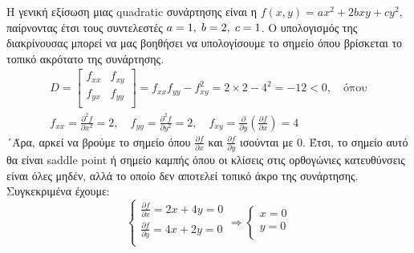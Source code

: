 Η γενική εξίσωση μιας quadratic συνάρτησης είναι η $f(x,y) = ax^2 + 2bxy + cy^2$, παίρνοντας έτσι τους συντελεστές $a=1, \hspace{1mm} b=2, \hspace{1mm} c=1$.
Ο υπολογισμός της διακρίνουσας μπορεί να μας βοηθήσει να υπολογίσουμε το σημείο όπου βρίσκεται το τοπικό ακρότατο της συνάρτησης. 
\begin{equation}
\begin{gathered}
D =
\left[
\begin{array}{cc}
	f_{xx} & f_{xy} \\
	f_{yx} & f_{yy} \\
\end{array}
\right]
= f_{xx} f_{yy} - f^2_{xy} = 2 \times 2 - 4^2 = -12 < 0, \quad \text{όπου} \\
f_{xx} = \frac{\partial^2 f}{\partial x^2} = 2, \quad
f_{yy} = \frac{\partial^2 f}{\partial y^2} = 2, \quad
f_{xy} = \frac{\partial}{\partial y} \left( \frac{\partial f}{\partial x} \right) = 4
\end{gathered}
\end{equation}
´Άρα, αρκεί να βρούμε το σημείο όπου $\frac{\partial f}{\partial x}$ και $\frac{\partial f}{\partial y}$ ισούνται με 0. Έτσι, το σημείο αυτό θα είναι saddle point ή σημείο καμπής όπου οι κλίσεις στις ορθογώνιες κατευθύνσεις είναι όλες μηδέν, αλλά το οποίο δεν αποτελεί τοπικό άκρο της συνάρτησης.
Συγκεκριμένα έχουμε: 
\begin{equation}
\left\{
\begin{array}{c}
	\frac{\partial f}{\partial x} = 2x + 4y = 0 \\ 
	\frac{\partial f}{\partial y} = 4x + 2y = 0 \\
\end{array}
\right.
\Rightarrow
\left\{
\begin{array}{c}
	x = 0\\y=0\\
\end{array}
\right.
\end{equation}